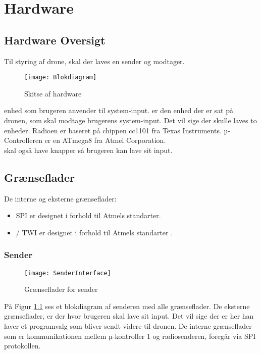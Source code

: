 \documentclass[Main]{subfiles}
\begin{document}
\chapter{Hardware}

\section{Hardware Oversigt}

Til styring af drone, skal der laves en sender og modtager.

\begin{figure}[H]
\centering
\texttt{[image: Blokdiagram]}
\caption{Skitse af hardware}
\end{figure}

 enhed som brugeren anvender til system-input.
 er den enhed der er sat på dronen, som skal modtage brugerens system-input.
Det vil sige der skulle laves to enheder. 
Radioen er baseret på chippen cc1101\cite{cc1101} fra Texas Instruments. 
µ-Controlleren er en ATmega8 fra Atmel Corporation.
\\  skal også have knapper så brugeren kan lave sit input.

\section{Grænseflader}
De interne og eksterne grænseflader:
\begin{itemize}
\item SPI er designet i forhold til Atmels standarter\cite{SPI}.
\item \itoc / TWI er designet i forhold til Atmels standarter \cite{Twi}.
\end{itemize}




\subsection{Sender}
\begin{figure}[H]
\centering
\texttt{[image: SenderInterface]}
\caption{Grænseflader for sender}
\label{fig: SenderInterface}
\end{figure}

På Figur \ref{fig: SenderInterface} ses et blokdiagram af senderen med alle grænseflader.
De eksterne grænseflader, er der hvor brugeren skal lave sit input. Det vil sige der er her han laver et programvalg som bliver sendt videre til dronen.
De interne grænseflader som er kommunikationen mellem µ-kontroller 1 og radiosenderen, foregår via SPI protokollen. 
\end{document}
